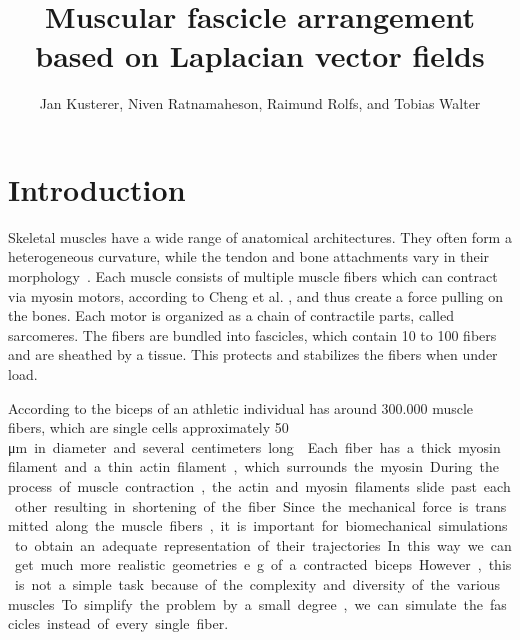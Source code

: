 \documentclass[preprint,journal]{vgtc}       %
\title{Muscular fascicle arrangement based on Laplacian vector fields}
\author{Jan Kusterer, Niven Ratnamaheson, Raimund Rolfs, and Tobias Walter}
\begin{document}
\maketitle

\section{Introduction}\label{sec:intro}
Skeletal muscles have a wide range of anatomical architectures. 
They often form a heterogeneous curvature, while the tendon and bone attachments vary in their morphology~\cite{Choi2013}. 
Each muscle consists of multiple muscle fibers which can contract via myosin motors, according to Cheng et al. 
\cite{Jiangcheng2015}, and thus create a force pulling on the bones. 
Each motor is organized as a chain of contractile parts, called sarcomeres. 
The fibers are bundled into fascicles, which contain 10 to 100 fibers and are sheathed by a tissue.
This protects and stabilizes the fibers when under load.

According to \cite{Etemadi.et.Al.} the biceps of an athletic individual has around 300.000 muscle fibers, which are single cells approximately 50 \si\micro m in diameter and several centimeters long \cite{Cooper2000}. 
Each fiber has a thick myosin filament and a thin actin filament, which surrounds the myosin. 
During the process of muscle contraction, the actin and myosin filaments slide past each other resulting in shortening of the fiber.

Since the mechanical force is transmitted along the muscle fibers, it is important for biomechanical simulations to obtain an adequate representation of their trajectories. 
In this way we can get much more realistic geometries e.g. of a contracted biceps.
However, this is not a simple task because of the complexity and diversity of the various muscles. 
To simplify the problem by a small degree, we can simulate the fascicles instead of every single fiber.
\end{document}

